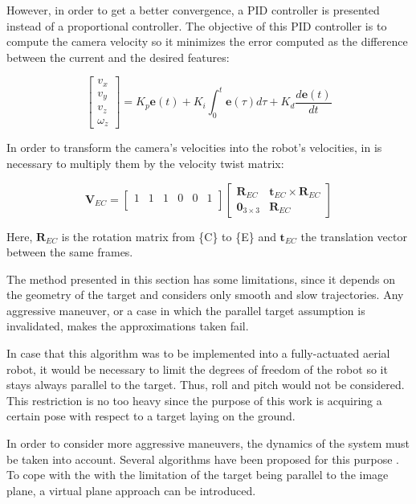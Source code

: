 However, in order to get a better convergence, a PID controller is presented instead of a proportional controller. The objective of this PID controller is to compute the camera velocity so it minimizes the error computed as the difference between the current and the desired features:

\begin{equation}
\begin{bmatrix}
v_x\\ 
v_y\\ 
v_z\\ 
\omega_z
\end{bmatrix}
=
K_p \bm{e}(t) + K_i \int_0^t \bm{e}(\tau) d\tau + K_d \frac{d\bm{e}(t)}{dt}
\end{equation}

In order to transform the camera's velocities into the robot's velocities, in is necessary to multiply them by the velocity twist matrix:

\begin{equation}
\bm{V}_{EC}
= 
\begin{bmatrix}
1 & 1 & 1 & 0 & 0 & 1 \\
\end{bmatrix}
\begin{bmatrix}
\bm{R}_{EC} & \bm{t}_{EC} \times \bm{R}_{EC} \\ 
\bm{0}_{3 \times 3} & \bm{R}_{EC}
\end{bmatrix}
\end{equation}

Here, $\bm{R}_{EC}$ is the rotation matrix from \{C\} to \{E\} and $\bm{t}_{EC}$ the translation vector between the same frames.

The method presented in this section has some limitations, since it depends on the geometry of the target and considers only smooth and slow trajectories. Any aggressive maneuver, or a case in which the parallel target assumption is invalidated, makes the approximations taken fail.

In case that this algorithm was to be implemented into a fully-actuated aerial robot, it would be necessary to limit the degrees of freedom of the robot so it stays always parallel to the target. Thus, roll and pitch would not be considered. This restriction is no too heavy since the purpose of this work is acquiring a certain pose with respect to a target laying on the ground. 

In order to consider more aggressive maneuvers, the dynamics of the system must be taken into account. Several algorithms have been proposed for this purpose \cite{ozawa_2011} \cite{jabbari_dynamic_2012} \cite{ceren_image_2012}. To cope with the with the limitation of the target being parallel to the image plane, a virtual plane approach \cite{zheng_image-based_2017} can be introduced.

